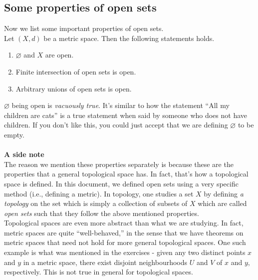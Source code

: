 \documentclass[12pt]{article}
\let\emptyset\varnothing
\newcounter{exercise}
\begin{document}
	\subsection{Some properties of open sets}
	Now we list some important properties of open sets.\\
	Let $(X, d)$ be a metric space. Then the following statements holds.
	\begin{enumerate} 
		\item $\emptyset$ and $X$ are open.
		\item Finite intersection of open sets is open.
		\item Arbitrary unions of open sets is open.
	\end{enumerate}
	$\emptyset$ being open is \emph{vacuously true}. It's similar to how the statement ``All my children are cats'' is a true statement when said by someone who does not have children. If you don't like this, you could just accept that we are defining $\emptyset$ to be empty.\\~\\
	\textbf{A side note}\\
	The reason we mention these properties separately is because these are the properties that a general topological space has. In fact, that's how a topological space is defined. In this document, we defined open sets using a very specific method (i.e., defining a metric). In topology, one studies a set $X$ by defining \emph{a topology} on the set which is simply a collection of subsets of $X$ which are called \emph{open sets} such that they follow the above mentioned properties.\\
	Topological spaces are even more abstract than what we are studying. In fact, metric spaces are quite ``well-behaved,'' in the sense that we have theorems on metric spaces that need not hold for more general topological spaces. One such example is what was mentioned in the exercises - given any two distinct points $x$ and $y$ in a metric space, there exist disjoint neighbourhoods $U$ and $V$ of $x$ and $y,$ respectively. This is not true in general for topological spaces.
\end{document}
